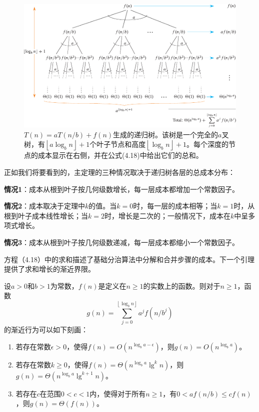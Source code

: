 \documentclass[lang=cn,newtx,10pt,scheme=chinese]{elegantbook}
\begin{document}
\begin{figure}[htbp]
    \centering
    \includegraphics{算法导论第四版插图/第四章/4-3.pdf}
    \caption{$T(n)=aT(n/b)+f(n)$生成的递归树。该树是一个完全的$a$叉树，有$\left\lfloor a \log _b n\right\rfloor+1$个叶子节点和高度$\left\lfloor\log _b n\right\rfloor+1$。每个深度的节点的成本显示在右侧，并在公式(4.18)中给出它们的总和。}
    \label{fig:4-3}
\end{figure}

正如我们将要看到的，主定理的三种情况取决于递归树各层的总成本分布：

\textbf{情况1}：成本从根到叶子按几何级数增长，每一层成本都增加一个常数因子。

\textbf{情况2}：成本取决于定理中$k$的值。当$k=0$时，每一层的成本相等；当$k=1$时，从根到叶子成本线性增长；当$k=2$时，增长是二次的；一般情况下，成本在$k$中呈多项式增长。

\textbf{情况3}：成本从根到叶子按几何级数递减，每一层成本都缩小一个常数因子。

方程（4.18）中的求和描述了基础分治算法中分解和合并步骤的成本。下一个引理提供了求和增长的渐近界限。

\begin{lemma}{}{}
设$a>0$和$b>1$为常数，$f(n)$是定义在$n\geq1$的实数上的函数。则对于$n\geq1$，函数
$$
g(n)=\sum_{j=0}^{\left\lfloor\log _b n\right\rfloor} a^j f\left(n / b^j\right)
$$
的渐近行为可以如下刻画：
\begin{enumerate}
\item 若存在常数$\epsilon>0$，使得$f(n)=O\left(n^{\log _b a-\epsilon}\right)$，则$g(n)=O\left(n^{\log _b a}\right)$。
\item 若存在常数$k \geq 0$，使得$f(n)=\Theta\left(n^{\log _b a} \lg ^k n\right)$，则$g(n)=\Theta\left(n^{\log _b a} \lg ^{k+1} n\right)$。
\item 若存在$c$在范围$0<c<1$内，使得对于所有$n\geq1$，有$0<a f(n / b) \leq c f(n)$，则$g(n)=\Theta(f(n))$。
\end{enumerate}
\end{lemma}
\end{document}
